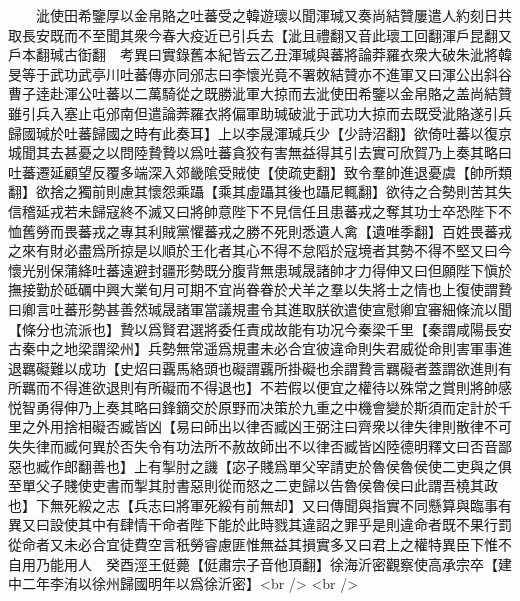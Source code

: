 　　泚使田希鑒厚以金帛賂之吐蕃受之韓遊瓌以聞渾瑊又奏尚結贊屢遣人約刻日共取長安既而不至聞其衆今春大疫近已引兵去【泚且禮翻又音此瓌工回翻渾戶昆翻又戶本翻瑊古衘翻　考異曰實錄舊本紀皆云乙丑渾瑊與蕃將論莽羅衣衆大破朱泚將韓旻等于武功武亭川吐蕃傳亦同邠志曰李懷光竟不署敇結贊亦不進軍又曰渾公出斜谷曹子逹赴渾公吐蕃以二萬騎從之既勝泚軍大掠而去泚使田希鑒以金帛賂之盖尚結贊雖引兵入塞止屯邠南但遣論莾羅衣將偏軍助瑊破泚于武功大掠而去既受泚賂遂引兵歸國瑊於吐蕃歸國之時有此奏耳】上以李晟渾瑊兵少【少詩沼翻】欲倚吐蕃以復京城聞其去甚憂之以問陸贄贄以爲吐蕃貪狡有害無益得其引去實可欣賀乃上奏其略曰吐蕃遷延顧望反覆多端深入郊畿隂受賊使【使疏吏翻】致令羣帥進退憂虞【帥所類翻】欲捨之獨前則慮其懷怨乘躡【乘其虛躡其後也躡尼輒翻】欲待之合勢則苦其失信稽延戎若未歸寇終不滅又曰將帥意陛下不見信任且患蕃戎之奪其功士卒恐陛下不恤舊勞而畏蕃戎之專其利賊黨懼蕃戎之勝不死則悉遺人禽【遺唯季翻】百姓畏蕃戎之來有財必盡爲所掠是以順於王化者其心不得不怠䧟於寇境者其勢不得不堅又曰今懷光别保蒲絳吐蕃遠避封疆形勢既分腹背無患瑊晟諸帥才力得伸又曰但願陛下愼於撫接勤於砥礪中興大業旬月可期不宜尚眷眷於犬羊之羣以失將士之情也上復使謂贄曰卿言吐蕃形勢甚善然瑊晟諸軍當議規畫令其進取朕欲遣使宣慰卿宜審細條流以聞【條分也流派也】贄以爲賢君選將委任責成故能有功况今秦梁千里【秦謂咸陽長安古秦中之地梁謂梁州】兵勢無常遥爲規畫未必合宜彼違命則失君威從命則害軍事進退羈礙難以成功【史炤曰覊馬絡頭也礙謂覊所掛礙也余謂贄言羈礙者蓋謂欲進則有所羈而不得進欲退則有所礙而不得退也】不若假以便宜之權待以殊常之賞則將帥感悦智勇得伸乃上奏其略曰鋒鏑交於原野而决策於九重之中機會變於斯須而定計於千里之外用捨相礙否臧皆凶【易曰師出以律否臧凶王弼注曰齊衆以律失律則散律不可失失律而臧何異於否失令有功法所不赦故師出不以律否臧皆凶陸德明釋文曰否音鄙惡也臧作郎翻善也】上有掣肘之譏【宓子賤爲單父宰請吏於魯侯魯侯使二吏與之俱至單父子賤使吏書而掣其肘書惡則從而怒之二吏歸以告魯侯魯侯曰此謂吾橈其政也】下無死綏之志【兵志曰將軍死綏有前無却】又曰傳聞與指實不同懸算與臨事有異又曰設使其中有肆情干命者陛下能於此時戮其違詔之罪乎是則違命者既不果行罰從命者又未必合宜徒費空言秖勞睿慮匪惟無益其損實多又曰君上之權特異臣下惟不自用乃能用人　癸酉涇王侹薨【侹肅宗子音他頂翻】徐海沂密觀察使高承宗卒【建中二年李洧以徐州歸國明年以爲徐沂密】<br />
<br />

